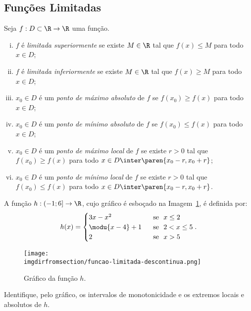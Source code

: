 \subsection{Funções Limitadas}

\begin{definition}
    Seja $f: D \subset \R \to \R$ uma função.
\begin{enumerate}[(i)]
  \item $f$ é \emph{limitada superiormente} se existe $M \in \R$ tal
  que $f(x) \leq M$ para todo $x \in D$;
  \item $f$ é \emph{limitada inferiormente} se existe $M \in \R$ tal
  que $f(x) \geq M$ para todo $x \in D$;
  \item $x_0 \in D$ é um \emph{ponto de máximo absoluto} de $f$ se
  $f(x_0) \geq f(x)$ para todo $x \in D$;
  \item $x_0 \in D$ é um \emph{ponto de mínimo absoluto} de $f$ se
  $f(x_0) \leq f(x)$ para todo $x \in D$;
  \item $x_0 \in D$ é um \emph{ponto de máximo local} de $f$ se
  existe $r>0$ tal que $f(x_0) \geq f(x)$ para todo $x \in D \inter \paren{x_0 - r , x_0+r}$;
  \item $x_0 \in D$ é um \emph{ponto de mínimo local} de $f$ se
  existe $r>0$ tal que $f(x_0) \leq f(x)$ para todo $x \in D \inter \paren{x_0 - r ,
  x_0+r}$.
\end{enumerate}
\end{definition}

\begin{example}
    A função $h : \left( -1 ; 6 \right] \to \R$, cujo gráfico é esboçado
na Imagem~\ref{img:funcao-limitada-descontinua}, é definida por:
%
$$h(x) = \begin{cases}
                                3x-x^2 & \ \text{ se } \ x\leq 2 \\
                                \modu{x-4} +1 & \ \text{ se } \ 2 < x \leq 5 \\
                                2 & \ \text{ se } \ x > 5 \\
                                \end{cases}.$$
%
\begin{figure}[H]
    \centering
    \texttt{[image: \\imgdirfromsection/funcao-limitada-descontinua.png]}
    \caption{Gráfico da função $h$.}
    \label{img:funcao-limitada-descontinua}
\end{figure}
%
Identifique, pelo gráfico, os intervalos de monotonicidade e os extremos locais e absolutos de $h$.
\end{example}

